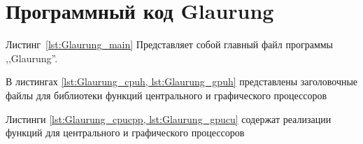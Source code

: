 \chapter{Программный код Glaurung}\label{app:A}

Листинг~\cref{lst:Glaurung_main} Представляет собой главный файл программы ,,Glaurung''. 

\begingroup
\captiondelim{ } %

\endgroup

В листингах \cref{lst:Glaurung_cpuh, lst:Glaurung_gpuh} представлены заголовочные файлы для библиотеки функций центрального и графического процессоров

\begingroup
\captiondelim{ } %

\endgroup

\begingroup
\captiondelim{ } %

\endgroup\texttt{}

Листинги \cref{lst:Glaurung_cpucpp, lst:Glaurung_gpucu} содержат реализации функций для центрального и графического процессоров

\begingroup
\captiondelim{ } %

\endgroup

\begingroup
\captiondelim{ } %

\endgroup\texttt{}
